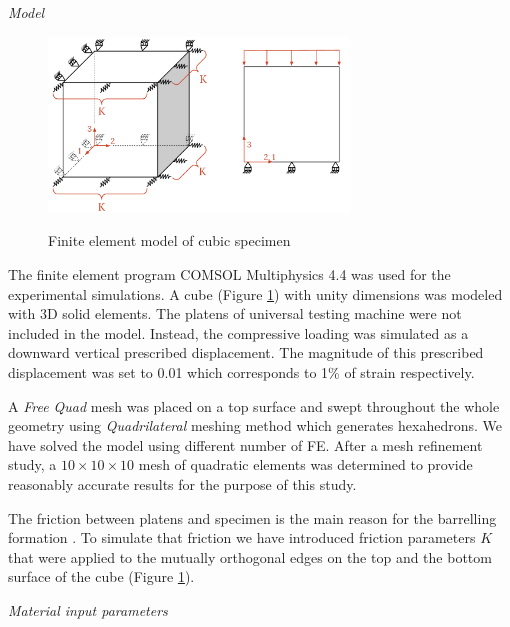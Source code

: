\documentclass[review]{elsarticle}
\begin{document}
\begin{description}
\item{\textit{Model}}
\end{description}

\begin{figure}[h]
\centering
\includegraphics[width=8cm]{BarellingPaper.pdf}
\label{fig:Barrelling}
\caption{\label{fig:Barrelling} Finite element model of cubic specimen}
\end{figure}



The finite element program COMSOL Multiphysics 4.4 \cite{Comsol} was used for
the experimental simulations.
A cube (Figure \ref{fig:Barrelling})  with unity dimensions was modeled with
3D solid elements.
The platens of universal testing machine were not included in the model.
Instead, the compressive loading was simulated as a downward vertical prescribed
displacement. The magnitude of this prescribed displacement was set to 0.01
which corresponds to  1\%  of  strain respectively.

A \textit{Free Quad} mesh was placed on a top surface and swept throughout
the whole geometry using \textit{Quadrilateral} meshing method which generates
hexahedrons. We have solved the model using different number of FE. 
After a mesh refinement study, a $10\times10\times10$ mesh of quadratic
elements was determined to provide reasonably accurate results for the purpose of this study.

The friction between platens and specimen is the main reason for the
barrelling formation \cite{Narayanasamy198821, kulkarni1969}. To simulate that
friction we have introduced friction parameters $K$ that were applied to the
mutually orthogonal edges on the top and the bottom surface of the cube (Figure
\ref{fig:Barrelling}).

\begin{description}
\item{\textit{Material input parameters}}
\end{description}
\end{document}
